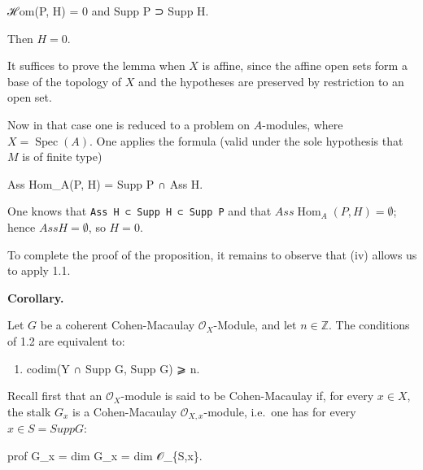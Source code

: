 \documentclass[
  11pt,
  a4paper,
]{book}
\newenvironment{Shaded}{}{}
\newcommand{\NormalTok}[1]{#1}
\begin{document}
\begin{Shaded}
\begin{Highlighting}[]
\NormalTok{ℋom(P, H) = 0 and Supp P ⊃ Supp H.}
\end{Highlighting}
\end{Shaded}

Then \(H = 0\).

It suffices to prove the lemma when \(X\) is affine, since the affine
open sets form a base of the topology of \(X\) and the hypotheses are
preserved by restriction to an open set.

Now in that case one is reduced to a problem on \(A\)-modules, where
\(X = \operatorname{Spec}(A)\). One applies the formula (valid under the
sole hypothesis that \(M\) is of finite type)

\begin{Shaded}
\begin{Highlighting}[]
\NormalTok{Ass Hom\_A(P, H) = Supp P ∩ Ass H.}
\end{Highlighting}
\end{Shaded}

One knows that \texttt{Ass\ H\ ⊂\ Supp\ H\ ⊂\ Supp\ P} and that
\(Ass \operatorname{Hom}_{A}(P, H) = \emptyset\); hence \(Ass H =
\emptyset\), so \(H = 0\).

To complete the proof of the proposition, it remains to observe that
(iv) allows us to apply 1.1.

\textbf{Corollary.}

Let \(G\) be a coherent Cohen-Macaulay \(\mathcal{O}_{X}\)-Module, and
let \(n \in \mathbb{Z}\). The conditions of 1.2 are equivalent to:

\begin{enumerate}
\def\labelenumi{\arabic{enumi}.}
\item
\begin{Shaded}
\begin{Highlighting}[]
\NormalTok{codim(Y ∩ Supp G, Supp G) ⩾ n.}
\end{Highlighting}
\end{Shaded}
\end{enumerate}

Recall first that an \(\mathcal{O}_{X}\)-module is said to be
Cohen-Macaulay if, for every \(x \in X\), the stalk \(G_{x}\) is a
Cohen-Macaulay \(\mathcal{O}_{X,x}\)-module, i.e.~one has for every
\(x \in S = Supp G\):

\begin{Shaded}
\begin{Highlighting}[]
\NormalTok{prof G\_x = dim G\_x = dim 𝒪\_\{S,x\}.}
\end{Highlighting}
\end{Shaded}
\end{document}

